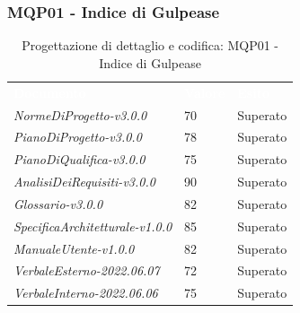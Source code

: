 \subsubsection{MQP01 - Indice di Gulpease}
\begin{table}[H]
        \renewcommand{\arraystretch}{1.5}
        \begin{tabular}{m{}<{\centering}  m{}<{\centering}  m{}<{\centering} }
            \rowcolor{darkblue}
            \textcolor{white}{\textbf{Documento}}& \textcolor{white}{\textbf{Valore}} & \textcolor{white}{\textbf{Esito}}\\ 

            \textit{NormeDiProgetto-v3.0.0} &
            70 &
            Superato \\

            \textit{PianoDiProgetto-v3.0.0} &
            78 &
            Superato \\

            \textit{PianoDiQualifica-v3.0.0} &
            75 &
            Superato \\

            \textit{AnalisiDeiRequisiti-v3.0.0} &
            90 &
            Superato \\
            
            \textit{Glossario-v3.0.0} &
            82 &
            Superato \\
            \textit{SpecificaArchitetturale-v1.0.0} &
            85 &
            Superato \\
            \textit{ManualeUtente-v1.0.0} &
            82 &
            Superato \\

            \textit{VerbaleEsterno-2022.06.07} &
            72 &
            Superato \\
          
            \textit{VerbaleInterno-2022.06.06} &
            75&
            Superato \\
    \end{tabular}
    \caption{Progettazione di dettaglio e codifica: MQP01 - Indice di Gulpease}
\end{table}
